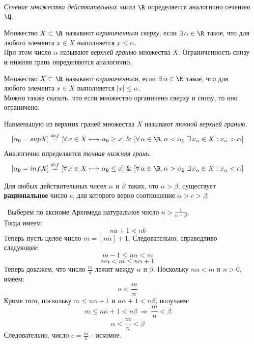 \begin{definition}
    \textit{Сечение множества действительных чисел \(\R\)} определяется 
    аналогично сечению \(\Q\).
\end{definition}

\begin{definition}
    Множество \(X\subset\R\) называют \textit{ограниченным сверху}, 
    если \(\exists\,\alpha\in\R\) такое, что для любого элемента \(x\in X\)
    выполняется \(x\leq\alpha\). \\
    При этом число \(\alpha\) называют \textit{верхней гранью} множества \(X\).
    Ограниченность снизу и нижняя грань определяются аналогично.
    
    \vspace{2mm} 

    Множество \(X\subset\R\) называют \textit{ограниченным}, 
    если \(\exists\,\alpha\in\R\) такое, что для любого элемента \(x\in X\)
    выполняется \(|x|\leq\alpha\). \\
    Можно также сказать, что если множество органичено сверху и снизу, то оно ограничено.
\end{definition}

\begin{definition}
    Наименьшую из верхних граней множества \(X\) называют \textit{точной верхней гранью}.
    \[[\alpha_{0} = sup X]\overset{def}{=}[\forall\,x\in X\longmapsto\alpha_{0}\geq x]
    ~\&~[\forall\,\alpha\in\R, \alpha<\alpha_{0}~\exists\,x_{\alpha}\in X:x_{\alpha}>\alpha]\]
    Аналогично определяется \textit{точная нижняя грань}.
    \[[\alpha_{0} = inf X]\overset{def}{=}[\forall\,x\in X\longmapsto\alpha_{0}\leq x]
    ~\&~[\forall\,\alpha\in\R, \alpha>\alpha_{0}~\exists\,x_{\alpha}\in X:x_{\alpha}<\alpha]\]
\end{definition} 

\begin{lemma}
    Для любых действительных чисел \(\alpha\) и \(\beta\) таких, что \(\alpha>\beta\), существует 
    \textbf{рациональное} число \(c\), для которого верно соотношение \(\alpha>c>\beta\).

    \vspace{2mm}

    \proofname~Выберем по аксиоме Архимеда натуральное число \(n > \frac{1}{\alpha-\beta}\). \\
    Тогда имеем: \[na+1<nb\] 
    Теперь пусть целое число \(m = [n\alpha]+1\). Следовательно, справедливо следующее:
    \[m-1\leq n\alpha < m\]
    \[n\alpha < m \leq n\alpha + 1\]
    Теперь докажем, что число \(\frac{m}{n}\) лежит между \(\alpha\) и \(\beta\).
    Поскольку \(n\alpha < m\) и \(n > 0\), имеем: \[a < \frac{m}{n}\]
    Кроме того, поскольку \(m \leq n\alpha + 1\) и \(n\alpha + 1 < n\beta\), получаем:
    \[m \leq n\alpha + 1 < n\beta ~ \Rightarrow ~ \frac{m}{n} < \beta\]
    \[\alpha < \frac{m}{n} < \beta\]
    Следовательно, число \(c = \frac{m}{n}\) - искомое.~\qedsymbol
\end{lemma}

